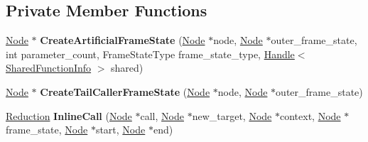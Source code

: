 \subsection*{Private Member Functions}
\begin{DoxyCompactItemize}
\item 
\hyperlink{classv8_1_1internal_1_1compiler_1_1_node}{Node} $\ast$ {\bfseries Create\+Artificial\+Frame\+State} (\hyperlink{classv8_1_1internal_1_1compiler_1_1_node}{Node} $\ast$node, \hyperlink{classv8_1_1internal_1_1compiler_1_1_node}{Node} $\ast$outer\+\_\+frame\+\_\+state, int parameter\+\_\+count, Frame\+State\+Type frame\+\_\+state\+\_\+type, \hyperlink{classv8_1_1internal_1_1_handle}{Handle}$<$ \hyperlink{classv8_1_1internal_1_1_shared_function_info}{Shared\+Function\+Info} $>$ shared)\hypertarget{classv8_1_1internal_1_1compiler_1_1_j_s_inliner_aa0206a6d02d79bf4a8749bd65d1e5b2c}{}\label{classv8_1_1internal_1_1compiler_1_1_j_s_inliner_aa0206a6d02d79bf4a8749bd65d1e5b2c}

\item 
\hyperlink{classv8_1_1internal_1_1compiler_1_1_node}{Node} $\ast$ {\bfseries Create\+Tail\+Caller\+Frame\+State} (\hyperlink{classv8_1_1internal_1_1compiler_1_1_node}{Node} $\ast$node, \hyperlink{classv8_1_1internal_1_1compiler_1_1_node}{Node} $\ast$outer\+\_\+frame\+\_\+state)\hypertarget{classv8_1_1internal_1_1compiler_1_1_j_s_inliner_a4494adc4286de2667c222a8b7afefa9f}{}\label{classv8_1_1internal_1_1compiler_1_1_j_s_inliner_a4494adc4286de2667c222a8b7afefa9f}

\item 
\hyperlink{classv8_1_1internal_1_1compiler_1_1_reduction}{Reduction} {\bfseries Inline\+Call} (\hyperlink{classv8_1_1internal_1_1compiler_1_1_node}{Node} $\ast$call, \hyperlink{classv8_1_1internal_1_1compiler_1_1_node}{Node} $\ast$new\+\_\+target, \hyperlink{classv8_1_1internal_1_1compiler_1_1_node}{Node} $\ast$context, \hyperlink{classv8_1_1internal_1_1compiler_1_1_node}{Node} $\ast$frame\+\_\+state, \hyperlink{classv8_1_1internal_1_1compiler_1_1_node}{Node} $\ast$start, \hyperlink{classv8_1_1internal_1_1compiler_1_1_node}{Node} $\ast$end)\hypertarget{classv8_1_1internal_1_1compiler_1_1_j_s_inliner_af5daeb87018863725f72450026a2cdf8}{}\label{classv8_1_1internal_1_1compiler_1_1_j_s_inliner_af5daeb87018863725f72450026a2cdf8}

\end{DoxyCompactItemize}
